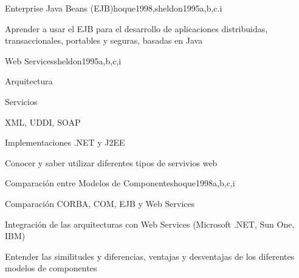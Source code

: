\begin{syllabus}
\begin{unit}{Enterprise Java Beans (EJB)}{hoque1998,sheldon1995}{a,b,c.i}
   \begin{learningoutcomes}
      \item Aprender a usar el EJB para el desarrollo de aplicaciones distribuidas, transaccionales, portables y seguras, basadas en Java
   \end{learningoutcomes}
\end{unit}

\begin{unit}{Web Services}{sheldon1995}{a,b,c,i}
   \begin{topics}
      \item Arquitectura
      \item Servicios
      \item XML, UDDI, SOAP
      \item Implementaciones .NET y J2EE
   \end{topics}

   \begin{learningoutcomes}
      \item Conocer y saber utilizar diferentes tipos de servivios web
   \end{learningoutcomes}
\end{unit}

\begin{unit}{Comparación entre Modelos de Componentes}{hoque1998}{a,b,c,i}
   \begin{topics}
      \item Comparación CORBA, COM, EJB y Web Services
      \item Integración de las arquitecturas con Web Services (Microsoft .NET, Sun One, IBM)
   \end{topics}

   \begin{learningoutcomes}
      \item Entender las similitudes y diferencias, ventajas y desventajas de los diferentes modelos de componentes
   \end{learningoutcomes}
\end{unit}

\begin{coursebibliography}
\end{coursebibliography}
\end{syllabus}
